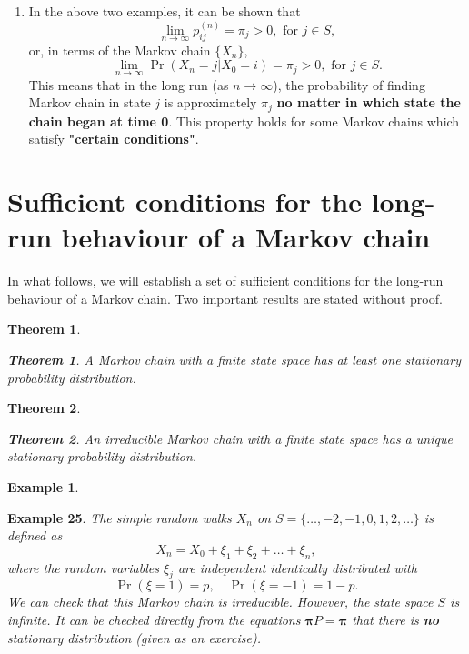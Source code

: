 \documentclass[
]{book}
\providecommand{\tightlist}{%
  \setlength{\itemsep}{0pt}\setlength{\parskip}{0pt}}
\newtheorem{theorem}{Theorem}[chapter]
\theoremstyle{definition}
\theoremstyle{definition}
\newtheorem{example}{Example}[chapter]
\theoremstyle{definition}
\theoremstyle{definition}
\theoremstyle{remark}
\begin{document}
\begin{enumerate}
\def\labelenumi{\arabic{enumi}.}
\tightlist
\item
  In the above two examples, it can be shown that
  \[\lim_{n \rightarrow \infty} p_{ij}^{(n)} = \pi_j > 0 , \text{ for }j \in S,\]
  or, in terms of the Markov chain \(\{X_n\}\),
  \[\lim_{n \rightarrow \infty} \Pr(X_n = j | X_0 = i) = \pi_j > 0, \text{ for }j \in S.\]
  This means that in the long run (as \(n\rightarrow \infty\)), the
  probability of finding Markov chain in state \(j\) is approximately
  \(\pi_j\) \textbf{no matter in which state the chain began at time 0}. This
  property holds for some Markov chains which satisfy \textbf{"certain
  conditions"}.
\end{enumerate}

\hypertarget{sufficient-conditions-for-the-long-run-behaviour-of-a-markov-chain}{%
\section{Sufficient conditions for the long-run behaviour of a Markov chain}\label{sufficient-conditions-for-the-long-run-behaviour-of-a-markov-chain}}

In what follows, we will establish a set of sufficient conditions for
the long-run behaviour of a Markov chain. Two important results are
stated without proof.

\begin{theorem}
\protect\hypertarget{thm:unlabeled-div-26}{}\label{thm:unlabeled-div-26}

\textbf{Theorem 1}. \emph{A Markov chain with a finite state space has at least
one stationary probability distribution.}

\end{theorem}

\begin{theorem}
\protect\hypertarget{thm:unlabeled-div-27}{}\label{thm:unlabeled-div-27}

\textbf{Theorem 2}. \emph{An irreducible Markov chain with a finite state space
has a unique stationary probability distribution.}

\end{theorem}

\begin{example}
\protect\hypertarget{exm:rwInfiniteS}{}\label{exm:rwInfiniteS}

\textbf{Example 25}. \emph{The simple random walks \(X_n\) on
\(S = \{\ldots, -2, -1, 0,1,2, \ldots \}\) is defined as
\[X_n = X_0 + \xi_1 + \xi_2 + \ldots + \xi_n,\] where the random
variables \(\xi_j\) are independent identically distributed with
\[\Pr(\xi = 1) = p, \quad \Pr(\xi = -1) = 1- p.\] We can check that this
Markov chain is irreducible. However, the state space \(S\) is infinite.
It can be checked directly from the equations
\(\boldsymbol{\pi} P =\boldsymbol{\pi}\) that there is \textbf{no} stationary
distribution (given as an exercise).}

\end{example}
\end{document}
